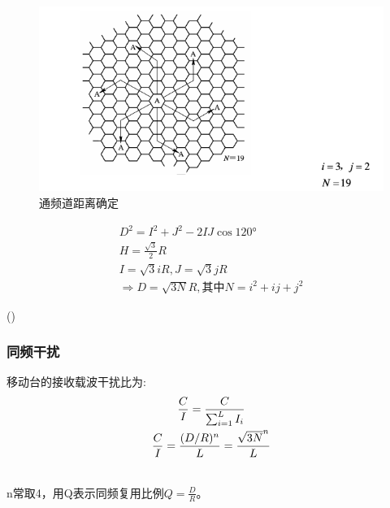 \documentclass[a4paper ]{report}
\begin{document}
	\begin{figure}[H]
		\centering
		\includegraphics[scale=0.65]{通频道距离确定.png}
		\caption{通频道距离确定}
	\end{figure}
	\begin{minipage}[c]{0.8\linewidth}
			\begin{gather*}
		D^2 = I^2 + J^2 - 2IJ\cos120°	\\
		H = \frac{\sqrt{3}}{2}R	\\
		I = \sqrt{3}iR,J = \sqrt{3}jR	\\
		\Rightarrow 
		D = \sqrt{3N}R,\text{其中}N = i^2+ij+j^2
		\end{gather*} 
	\end{minipage}
	\begin{minipage}[r]{0.2\linewidth}
		(\theequation)
	\end{minipage}
	
	\subsubsection{同频干扰}
	移动台的接收载波干扰比为: \\

	\begin{gather}
		\frac{C}{I} = \frac{C}{\sum_{i=1}^{L}I_i} \notag  \\
		\frac{C}{I} = \frac{(D/R)^n}{L}=\frac{\sqrt{3N}^n}{L} 
		\label{eq:载干比}
	\end{gather}

	 \\
	n常取4，用Q表示同频复用比例$Q = \frac{D}{R}$。
\end{document}
